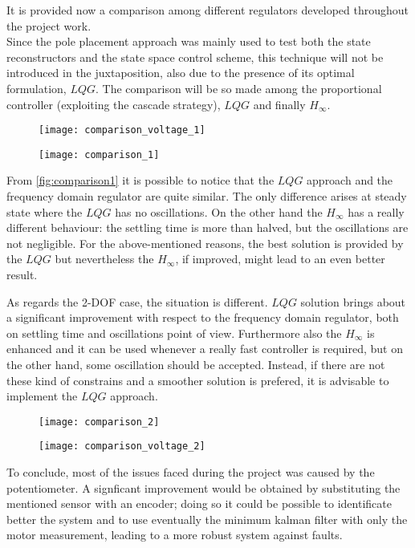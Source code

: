 It is provided now a comparison among different regulators developed throughout the project work. \\ Since the pole placement approach was mainly used to test both the state reconstructors and the state space control scheme, this technique will not be introduced in the juxtaposition, also due to the presence of its optimal formulation, $LQG$.
The comparison will be so made among the proportional controller (exploiting the cascade strategy), $LQG$ and finally $H_{\infty}$.
\begin{figure*}[h]
	\centering
	\begin{subfigure}{0.45\columnwidth}
		\texttt{[image: comparison\_voltage\_1]}
	\end{subfigure}
	\begin{subfigure}{0.45\columnwidth}
		\texttt{[image: comparison\_1]}
	\end{subfigure}
	\caption{Different control tecnhiques for the 1 DOF case}
	\label{fig:comparison1}
\end{figure*}

\par From \cref{fig:comparison1} it is possible to notice that the $LQG$ approach and the frequency domain regulator are quite similar. The only difference arises at steady state where the $LQG$ has no oscillations. On the other hand the $H_{\infty}$ has a really different behaviour: the settling time is more than halved, but the oscillations are not negligible. For the above-mentioned reasons, the best solution is provided by the $LQG$ but nevertheless the $H_{\infty}$, if improved, might lead to an even better result.
\par
As regards the 2-DOF case, the situation is different. $LQG$ solution brings about a significant improvement with respect to the frequency domain regulator, both on settling time and oscillations point of view. Furthermore also the $H_{\infty}$ is enhanced and it can be used whenever a really fast controller is required, but on the other hand, some oscillation should be accepted. Instead, if there are not these kind of constrains and a smoother solution is prefered, it is advisable to implement the $LQG$ approach.

\begin{figure*}[h]
	\centering
	\begin{subfigure}{0.45\columnwidth}
		\texttt{[image: comparison\_2]}
	\end{subfigure}
	\begin{subfigure}{0.45\columnwidth}
		\texttt{[image: comparison\_voltage\_2]}
	\end{subfigure}
	\caption{Different control tecnhiques for the 2 DOF case}
	\label{fig:comparison1}
\end{figure*}
\par
To conclude, most of the issues faced during the project was caused by the potentiometer. A signficant improvement would be obtained by substituting the mentioned sensor with an encoder; doing so it could be possible to identificate better the system and to use eventually the minimum kalman filter with only the motor measurement, leading to a more robust system against faults.  

